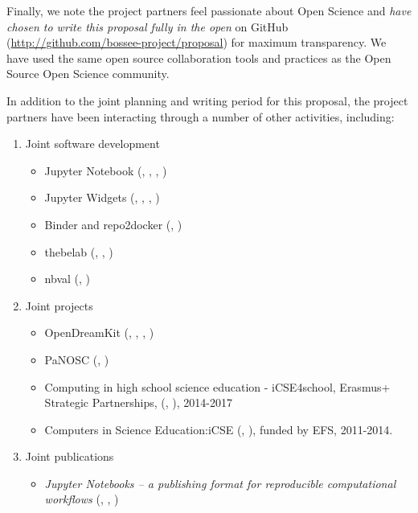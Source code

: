 Finally, we note the project partners feel passionate about Open Science and
\emph{have chosen to write this proposal fully in the open} on GitHub
(\href{http://github.com/bossee-project/proposal}{http://github.com/bossee-project/proposal}) for maximum transparency.
We have used the same open source collaboration tools and practices
as the Open Source Open Science community.

In addition to the joint planning and writing period for this
proposal, the project partners have been interacting through a number of
other activities, including:

\begin{enumerate}
\item Joint software development
  \begin{itemize}
  \item Jupyter Notebook (, , , )
  \item Jupyter Widgets (, , , )
  \item Binder and repo2docker (, )
  \item thebelab (, , )
  \item nbval (, )
  \end{itemize}

\item Joint projects
  \begin{itemize}
  \item OpenDreamKit (, , , )
  \item PaNOSC (, )
  \item Computing in high school science education - iCSE4school, Erasmus+ Strategic Partnerships,
  (, ), 2014-2017
  \item Computers in Science Education:iCSE (, ), funded by EFS, 2011-2014.
    \end{itemize}

\item Joint publications
  \begin{itemize}
  \item \emph{Jupyter Notebooks -- a publishing format for
      reproducible computational workflows} \cite{Kluyver2016} (, , )
  \end{itemize}


\end{enumerate}
